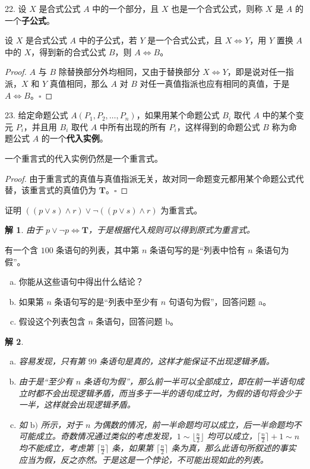 \documentclass[normal,cyan]{elegantnote}
\newtheorem{solve}{解}
\newcommand{\QED}{\square}
\begin{document}
22. 设 $X$ 是合式公式 $A$ 中的一个部分，且 $X$ 也是一个合式公式，则称 $X$ 是 $A$ 的一个\textbf{子公式}。
\begin{theorem}[置换规则]
    设 $X$ 是合式公式 $A$ 中的子公式，若 $Y$ 是一个合式公式，且 $X \Longleftrightarrow Y$，用 $Y$ 置换 $A$ 中的 $X$，得到新的合式公式 $B$，则 $A \Longleftrightarrow B$。
\end{theorem}
\begin{proof}
    $A$ 与 $B$ 除替换部分外均相同，又由于替换部分 $X \Longleftrightarrow Y$，即是说对任一指派，$X$ 和 $Y$ 真值相同，那么 $A$ 对 $B$ 对任一真值指派也应有相同的真值，于是 $A \Longleftrightarrow B$。$\QED$
\end{proof}
23. 给定命题公式 $A(P_1, P_2, \dots, P_n)$，如果用某个命题公式 $B_i$ 取代 $A$ 中的某个变元 $P_i$，并且用 $B_i$ 取代 $A$ 中所有出现的所有 $P_i$，这样得到的命题公式 $B$ 称为命题公式 $A$ 的一个\textbf{代入实例}。
\begin{theorem}[代入规则]
    一个重言式的代入实例仍然是一个重言式。
\end{theorem}
\begin{proof}
    由于重言式的真值与真值指派无关，故对同一命题变元都用某个命题公式代替，该重言式的真值仍为 $\mathbf{T}$。$\QED$
\end{proof}
\begin{example}
    证明 $((p \vee s) \wedge r) \vee \neg((p \vee s) \wedge r)$ 为重言式。
\end{example}
\begin{solve}
    由于 $p \vee \neg p \Longleftrightarrow \mathbf{T}$，于是根据代入规则可以得到原式为重言式。
\end{solve}
\begin{example}
    有一个含 $100$ 条语句的列表，其中第 $n$ 条语句写的是“列表中恰有 $n$ 条语句为假”。
    \begin{enumerate}[a)]
        \item 你能从这些语句中得出什么结论？
        \item 如果第 $n$ 条语句写的是“列表中至少有 $n$ 句语句为假”，回答问题 a。
        \item 假设这个列表包含 $n$ 条语句，回答问题 b。
    \end{enumerate}
\end{example}
\begin{solve}
    \begin{enumerate}[a)]
        \item 容易发现，只有第 $99$ 条语句是真的，这样才能保证不出现逻辑矛盾。
        \item 由于是“至少有 $n$ 条语句为假”，那么前一半可以全部成立，即在前一半语句成立时都不会出现逻辑矛盾，而当多于一半的语句成立时，为假的语句将会少于一半，这样就会出现逻辑矛盾。
        \item 如 $\text{b)}$ 所示，对于 $n$ 为偶数的情况，前一半命题均可以成立，后一半命题均不可能成立。奇数情况通过类似的考虑发现，$1 \sim \lfloor \frac {n}{2} \rfloor $ 均可以成立，$\lceil  \frac {n}{2} \rceil  + 1  \sim n$ 均不能成立，考虑第 $\lceil  \frac {n}{2} \rceil$ 条，如果第 $\lceil  \frac {n}{2} \rceil$ 条为真，那么此语句所叙述的事实应当为假，反之亦然。于是这是一个悖论，不可能出现如此的列表。
    \end{enumerate}
\end{solve}
\end{document}
